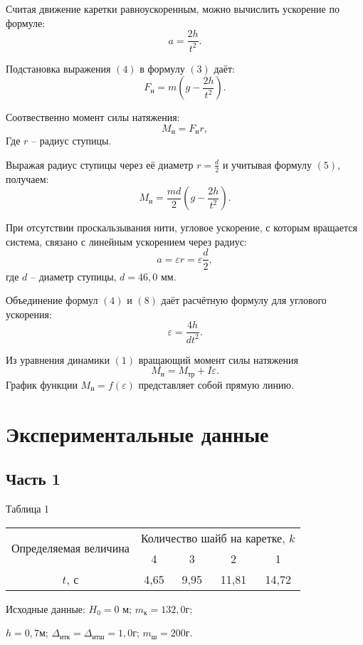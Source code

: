 \documentclass[12pt]{article}
\begin{document}
Считая движение каретки равноускоренным, можно вычислить ускорение по формуле:
\begin{equation}
a = \frac{2h}{t^2}.
\end{equation}

Подстановка выражения $(4)$ в формулу $(3)$ даёт:
\begin{equation}
	F_{н}=m(g-\frac{2h}{t^2 }).	
\end{equation}

Соотвественно момент силы натяжения:
\begin{equation}
	M_{н} = F_{н}r,	
\end{equation}	
Где $r$ – радиус ступицы. 

Выражая радиус ступицы через её диаметр $r=\frac{d}{2}$ и учитывая формулу $(5)$, получаем:
\begin{equation} 
	M_{н}=\frac{md}{2} (g-\frac{2h}{t^2 }).	
\end{equation}

При отсутствии проскальзывания нити, угловое ускорение, с которым вращается система, связано с линейным ускорением через радиус:
	\begin{equation}
	 a=\varepsilon r=\varepsilon \frac{d}{2},
	 \end{equation}
где $d$ – диаметр ступицы, $d = 46,0$ мм.

Объединение формул $(4)$ и $(8)$ даёт расчётную формулу для углового ускорения:
\begin{equation}	
\varepsilon=\frac{4h}{dt^2 }.	
\end{equation}

Из уравнения динамики $(1)$ вращающий момент силы натяжения
\begin{equation}
	M_{н}=M_{тр}+I\varepsilon.
	\end{equation}
 График функции $M_{н}=f(\varepsilon)$ представляет собой прямую линию.
\section*{Экспериментальные данные}
\subsection*{Часть 1}
\begin{table}[h!]
\begin{center}
Таблица 1

\begin{tabular}{|c|c|c|c|c|}
\hline
\multirow{2}{*}{Определяемая величина} & \multicolumn{4}{c|}{Количество шайб на каретке, $k$} \\
\hhline{~----}
 &4  & 3&2&	1	 \\\hline

$t$, с &   4,65	 &9,95	 &11,81	 &14,72\\

\hline
\end{tabular}
\par\bigskip     
Исходные данные:
$H_{0}=0$ м;
$m_{к}=132,0$г;

$h=0,7$м;
$\Delta_{итк}=\Delta_{итш} =1,0$г;
$m_{ш}=200$г. 
\end{center}
\end{table} 
\end{document}
